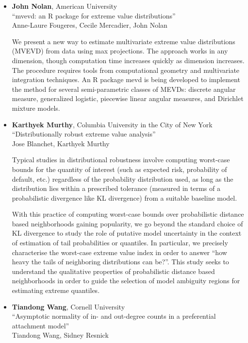 \begin{itemize}
\item \textbf{John Nolan}, American University \\
``mvevd: an R package for extreme value distributions'' \\
Anne-Laure Fougeres, Cecile Mercadier, John Nolan


We present a new way to estimate multivariate extreme value distributions (MVEVD) from data using max projections.
The approach works in any dimension, though computation time increases quickly as dimension increases.
The procedure requires tools from computational geometry and multivariate integration techniques.
An R package mevd is being developed to implement the method for several semi-parametric classes of MEVDs:
discrete angular measure, generalized logistic, piecewise linear angular measures, and Dirichlet mixture models.

\item \textbf{Karthyek Murthy}, Columbia University in the City of New York \\
``Distributionally robust extreme value analysis'' \\
Jose Blanchet, Karthyek Murthy


Typical studies in distributional robustness involve computing worst-case bounds for the quantity of interest (such as expected risk, probability of default, etc.) regardless of the probability distribution used, as long as the distribution lies within a prescribed tolerance (measured in terms of a probabilistic divergence like KL divergence) from a suitable baseline model. 

With this practice of computing worst-case bounds over probabilistic distance based neighborhoods gaining popularity, we go beyond the standard choice of KL divergence to study the role of putative model uncertainty in the context of estimation of tail probabilities or quantiles. In particular, we precisely   characterise  the worst-case extreme value index in order to answer “how heavy the tails of neighboring distributions can be?”. This study seeks to understand the qualitative properties of probabilistic distance based neighborhoods in order to guide the selection of model ambiguity regions for estimating extreme quantiles.  

\item \textbf{Tiandong Wang}, Cornell University \\
``Asymptotic normality of in- and out-degree counts in a preferential attachment model'' \\
Tiandong Wang, Sidney Resnick



\end{itemize}

